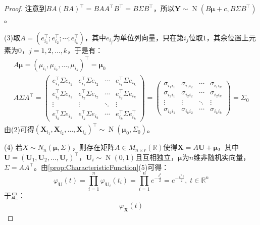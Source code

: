\begin{proof}
	注意到$BA(BA)^{\top}=BAA^{\top}B^{\top}=B\Sigma B^{\top}$，所以$\mathbf{Y}\sim \operatorname{N}(B\boldsymbol{\mu}+c,B\Sigma B^{\top})$。\par
	(3)取$A=(e_{i_1}^{\top};e_{i_2}^{\top};\cdots;e_{i_k}^{\top})$，其中$e_{i_j}$为单位列向量，只在第$i_j$位取$1$，其余位置上元素为$0$，$j=1,2,\dots,k$，于是有：
	\begin{gather*}
		A\boldsymbol{\mu}=(\mu_{i_i},\mu_{i_2},\dots,\mu_{i_k})^{\top}=\boldsymbol{\mu}_0
		\\
		A\Sigma A^{\top}=
		\begin{pmatrix}
			e_{i_1}^{\top}\Sigma e_{i_1} & e_{i_1}^{\top}\Sigma e_{i_2} & \cdots & e_{i_1}^{\top}\Sigma e_{i_k} \\
			e_{i_2}^{\top}\Sigma e_{i_1} & e_{i_2}^{\top}\Sigma e_{i_2} & \cdots & e_{i_2}^{\top}\Sigma e_{i_k} \\
			\vdots & \vdots & \ddots & \vdots \\
			e_{i_k}^{\top}\Sigma e_{i_1} & e_{i_k}^{\top}\Sigma e_{i_2} & \cdots & e_{i_k}^{\top}\Sigma e_{i_k}^{\top}
		\end{pmatrix}
		=
		\begin{pmatrix}
			\sigma_{i_1i_1} & \sigma_{i_1i_2} & \cdots & \sigma_{i_1i_k} \\
			\sigma_{i_2i_1} & \sigma_{i_2i_2} & \cdots & \sigma_{i_2i_k} \\
			\vdots & \vdots & \ddots & \vdots \\
			\sigma_{i_ki_1} & \sigma_{i_ki_2} & \cdots & \sigma_{i_ki_k}
		\end{pmatrix}
		=\Sigma_0
	\end{gather*}
	由(2)可得$(\mathbf{X}_{i_1},\mathbf{X}_{i_2},\dots,\mathbf{X}_{i_k})^{\top}\sim \operatorname{N}(\boldsymbol{\mu}_0,\Sigma_0)$。\par
	(4)	若$X\sim N_n(\boldsymbol{\mu},\Sigma)$，则存在矩阵$A\in M_{n\times r}(\mathbb{R})$使得$\mathbf{X}=A\mathbf{U}+\boldsymbol{\mu}$，其中$\mathbf{U}=(\mathbf{U}_1,\mathbf{U}_2,\dots,\mathbf{U}_r)^{\top}$，$\mathbf{U}_i\sim \operatorname{N}(0,1)$且互相独立，$\boldsymbol{\mu}$为$n$维非随机实向量，$\Sigma=AA^{\top}$。由\cref{prop:CharacteristicFunction}(5)可得：
	\begin{equation*}
		\varphi_\mathbf{U}(t)=\prod_{i=1}^n\varphi_{\mathbf{U}_i}(t_i)
		=\prod_{i=1}^ne^{-\frac{t_i^2}{2}}=e^{-\frac{t^{\top}t}{2}},\;t\in\mathbb{R}^{n}
	\end{equation*}
	于是：
	\begin{align*}
		\varphi_\mathbf{X}(t)

\end{align*}
\end{proof}
